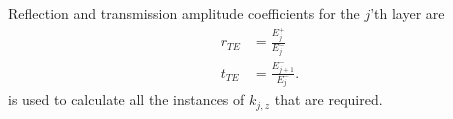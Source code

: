 \documentclass[10pt,twoside, b5paper,pdftex]{report}
\begin{document}
Reflection and transmission amplitude coefficients for the $j$'th layer are
\begin{subequations}
\begin{align}
r_{TE} &= \frac{E^{+}_{j}}{E^{-}_{j}} \\
t_{TE} &= \frac{E^{-}_{j+1}}{E^{-}_{j}}.
\end{align}
\end{subequations}
 is used to calculate all the instances of $k_{j,z}$ that are required.

\end{document}
